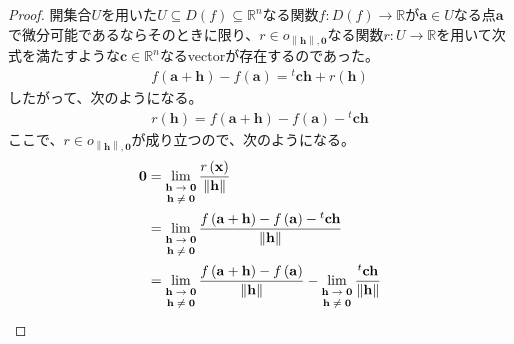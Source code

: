 \documentclass[dvipdfmx]{jsarticle}
\begin{document}
\begin{proof}
開集合$U$を用いた$U \subseteq D(f) \subseteq \mathbb{R}^{n}$なる関数$f:D(f) \rightarrow \mathbb{R}$が$\mathbf{a} \in U$なる点$\mathbf{a}$で微分可能であるならそのときに限り、$r \in o_{\left\| \mathbf{h} \right\|,\mathbf{0}}$なる関数$r:U \rightarrow \mathbb{R}$を用いて次式を満たすような$\mathbf{c} \in \mathbb{R}^{n}$なるvectorが存在するのであった。
\begin{align*}
f\left( \mathbf{a} + \mathbf{h} \right) - f\left( \mathbf{a} \right) ={}^{t}\mathbf{ch} + r\left( \mathbf{h} \right)
\end{align*}
したがって、次のようになる。
\begin{align*}
r\left( \mathbf{h} \right) = f\left( \mathbf{a} + \mathbf{h} \right) - f\left( \mathbf{a} \right) -{}^{t}\mathbf{ch}
\end{align*}
ここで、$r \in o_{\left\| \mathbf{h} \right\|,\mathbf{0}}$が成り立つので、次のようになる。
\begin{align*}
\mathbf{0} &= \lim_{\scriptsize \begin{matrix}
\mathbf{h} \rightarrow \mathbf{0} \\
\mathbf{h \neq 0} \\
\end{matrix}}\frac{r\left( \mathbf{x} \right)}{\left\| \mathbf{h} \right\|}\\
&= \lim_{\scriptsize \begin{matrix}
\mathbf{h} \rightarrow \mathbf{0} \\
\mathbf{h} \neq \mathbf{0} \\
\end{matrix}}\frac{f\left( \mathbf{a} + \mathbf{h} \right) - f\left( \mathbf{a} \right) -{}^{t}\mathbf{ch}}{\left\| \mathbf{h} \right\|}\\
&= \lim_{\scriptsize \begin{matrix}
\mathbf{h} \rightarrow \mathbf{0} \\
\mathbf{h} \neq \mathbf{0} \\
\end{matrix}}\frac{f\left( \mathbf{a} + \mathbf{h} \right) - f\left( \mathbf{a} \right)}{\left\| \mathbf{h} \right\|} - \lim_{\scriptsize \begin{matrix}
\mathbf{h} \rightarrow \mathbf{0} \\
\mathbf{h} \neq \mathbf{0} \\
\end{matrix}}\frac{{}^{t}\mathbf{ch}}{\left\| \mathbf{h} \right\|}
\end{align*}

\end{proof}
\end{document}
